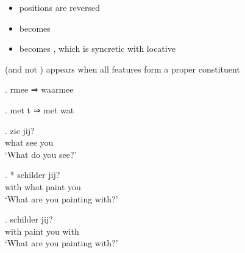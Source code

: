 \documentclass[xcolor=dvipsnames,10pt]{beamer}
\begin{document}
\begin{frame}


\vspace{1em}

\pause

\begin{itemize}
	\item positions are reversed \pause
	\item {} becomes  \pause
	\item {} becomes , which is syncretic with locative
\end{itemize}

\vspace{1em}

 (and not ) appears when all features form a proper constituent

\end{frame}




\begin{frame}

\ex. rmee ⇒ waarmee

\ex. met t ⇒ met wat

\pause
\vspace{1em}

\exg.  zie jij?\\
 what see you\\
 `What do you see?'\label{ex:wat}

\exg. *  schilder jij?\\
 with what paint you\\
 `What are you painting with?'\label{ex:metwat}

\exg.   schilder jij?\\
  with paint you with\\
 `What are you painting with?'\label{ex:waar-mee}

\end{frame}
\end{document}
